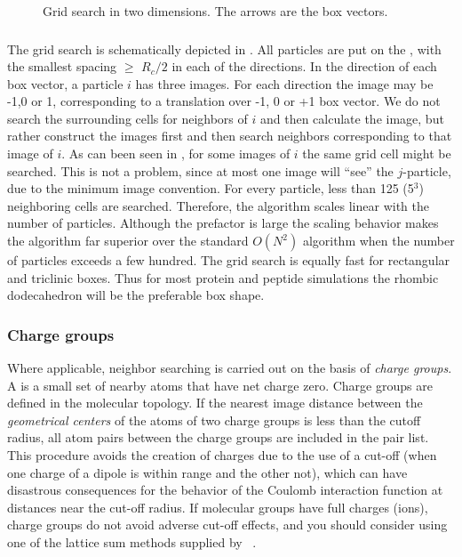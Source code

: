\begin{figure}
\centerline{}
\caption {Grid search in two dimensions. The arrows are the box vectors.}
\label{fig:grid}
\end{figure}

\subsubsection{}
\label{sec:nsgrid}
The grid search is schematically depicted in .
All particles are put on the {\nsgrid}, with the smallest spacing
$\ge$ $R_c/2$ in each of the directions.
In the direction of each box vector, a particle $i$ has three images. For each
direction the image may be -1,0 or 1, corresponding to a translation
over -1, 0 or +1 box vector. We do not search the surrounding
{\nsgrid} cells for neighbors of $i$ and then calculate the image, but
rather construct the images first and then search neighbors
corresponding to that image of $i$.
As can been seen in , for some images of $i$ the same
grid cell might be searched. This is not a problem, since at most one
image will ``see'' the $j$-particle, due to the minimum image convention.
For every particle, less than 125 (5$^3$) neighboring cells are searched.
Therefore, the algorithm scales linear with the number of particles.
Although the prefactor is large
the scaling behavior makes the algorithm far superior over the
standard $O(N^2)$ algorithm when the number of particles
exceeds a few hundred.
The grid search is equally fast for rectangular and triclinic boxes.
Thus for most protein and peptide simulations the rhombic dodecahedron
will be the preferable box shape.

\subsubsection{Charge groups}
Where applicable, neighbor searching is carried out on the basis of
{\em charge groups}. A  is a small set of nearby atoms
that  have net charge zero. Charge groups are defined in the molecular
topology. If the nearest image  distance between the {\em geometrical
centers} of the atoms of two charge groups is less than the cutoff
radius,  all atom pairs between the charge groups are included in the
pair list. This procedure avoids the creation of charges due to
the use  of a cut-off (when one charge of a dipole is within range and
the  other not), which can have disastrous consequences for the
behavior of  the Coulomb interaction function at distances near the
cut-off  radius. If molecular groups have full charges (ions), charge
groups  do not avoid adverse cut-off effects, and you should consider
using one of the lattice sum methods supplied by {\gromacs}~\cite{Berendsen93a}. 

